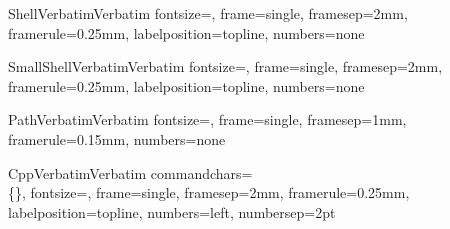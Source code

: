 \DefineVerbatimEnvironment%
{ShellVerbatim}{Verbatim}%
{fontsize=\small,%
frame=single,%
framesep=2mm,%
framerule=0.25mm,%
labelposition=topline,%
numbers=none%
}

\DefineVerbatimEnvironment%
{SmallShellVerbatim}{Verbatim}%
{fontsize=\footnotesize,%
frame=single,%
framesep=2mm,%
framerule=0.25mm,%
labelposition=topline,%
numbers=none%
}

\DefineVerbatimEnvironment%
{PathVerbatim}{Verbatim}%
{fontsize=\small,%
frame=single,%
framesep=1mm,%
framerule=0.15mm,%
numbers=none%
}

\DefineVerbatimEnvironment%
{CppVerbatim}{Verbatim}%
{commandchars=\\\{\},%
fontsize=\small,%
frame=single,%
framesep=2mm,%
framerule=0.25mm,%
labelposition=topline,
numbers=left,%
numbersep=2pt%
}



